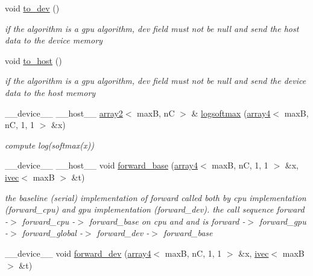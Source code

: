 \begin{DoxyCompactItemize}
\mbox{\label{structSoftmaxCrossEntropy_a86bfec6f584b9c489e5c51209f37666d}} 
void \hyperlink{structSoftmaxCrossEntropy_a86bfec6f584b9c489e5c51209f37666d}{to\+\_\+dev} ()
\begin{DoxyCompactList}\small\item\em if the algorithm is a gpu algorithm, dev field must not be null and send the host data to the device memory \end{DoxyCompactList}\item 
\mbox{\label{structSoftmaxCrossEntropy_ab30b7d1d000db2d9d2bfad95d1dcb7a8}} 
void \hyperlink{structSoftmaxCrossEntropy_ab30b7d1d000db2d9d2bfad95d1dcb7a8}{to\+\_\+host} ()
\begin{DoxyCompactList}\small\item\em if the algorithm is a gpu algorithm, dev field must not be null and send the device data to the host memory \end{DoxyCompactList}\item 
\+\_\+\+\_\+device\+\_\+\+\_\+ \+\_\+\+\_\+host\+\_\+\+\_\+ \hyperlink{structarray2}{array2}$<$ maxB, nC $>$ \& \hyperlink{structSoftmaxCrossEntropy_a4f2a21b5bd9663d832b618f0b26a01df}{logsoftmax} (\hyperlink{structarray4}{array4}$<$ maxB, nC, 1, 1 $>$ \&x)
\begin{DoxyCompactList}\small\item\em compute log(softmax(x)) \end{DoxyCompactList}\item 
\+\_\+\+\_\+device\+\_\+\+\_\+ \+\_\+\+\_\+host\+\_\+\+\_\+ void \hyperlink{structSoftmaxCrossEntropy_a8a478a94bbd9fd17e08fe86cb758d90f}{forward\+\_\+base} (\hyperlink{structarray4}{array4}$<$ maxB, nC, 1, 1 $>$ \&x, \hyperlink{structivec}{ivec}$<$ maxB $>$ \&t)
\begin{DoxyCompactList}\small\item\em the baseline (serial) implementation of forward called both by cpu implementation (forward\+\_\+cpu) and gpu implementation (forward\+\_\+dev). the call sequence forward -\/$>$ forward\+\_\+cpu -\/$>$ forward\+\_\+base on cpu and and is forward -\/$>$ forward\+\_\+gpu -\/$>$ forward\+\_\+global -\/$>$ forward\+\_\+dev -\/$>$ forward\+\_\+base \end{DoxyCompactList}\item 
\+\_\+\+\_\+device\+\_\+\+\_\+ void \hyperlink{structSoftmaxCrossEntropy_ac64934c6de42a065529dceafa38c157a}{forward\+\_\+dev} (\hyperlink{structarray4}{array4}$<$ maxB, nC, 1, 1 $>$ \&x, \hyperlink{structivec}{ivec}$<$ maxB $>$ \&t)

\end{DoxyCompactItemize}
